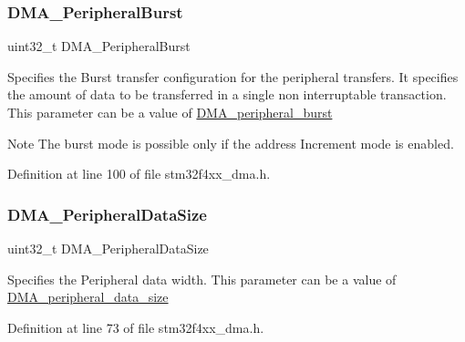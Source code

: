 \mbox{\label{struct_d_m_a___init_type_def_a6772e281310a3e93781364c723984138}} 
\subsubsection{\texorpdfstring{D\+M\+A\+\_\+\+Peripheral\+Burst}{DMA\_PeripheralBurst}}
{\footnotesize\ttfamily uint32\+\_\+t D\+M\+A\+\_\+\+Peripheral\+Burst}

Specifies the Burst transfer configuration for the peripheral transfers. It specifies the amount of data to be transferred in a single non interruptable transaction. This parameter can be a value of \hyperlink{group___d_m_a__peripheral__burst}{D\+M\+A\+\_\+peripheral\+\_\+burst} \begin{DoxyNote}{Note}
The burst mode is possible only if the address Increment mode is enabled. 
\end{DoxyNote}


Definition at line 100 of file stm32f4xx\+\_\+dma.\+h.

\mbox{\label{struct_d_m_a___init_type_def_a61bf939d8657d44a9beb1daa91c14668}} 
\subsubsection{\texorpdfstring{D\+M\+A\+\_\+\+Peripheral\+Data\+Size}{DMA\_PeripheralDataSize}}
{\footnotesize\ttfamily uint32\+\_\+t D\+M\+A\+\_\+\+Peripheral\+Data\+Size}

Specifies the Peripheral data width. This parameter can be a value of \hyperlink{group___d_m_a__peripheral__data__size}{D\+M\+A\+\_\+peripheral\+\_\+data\+\_\+size} 

Definition at line 73 of file stm32f4xx\+\_\+dma.\+h.

\mbox{\label{struct_d_m_a___init_type_def_ad0bf5e8b3968eaf8dc18e923b94acfe1}} 

